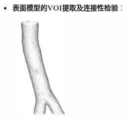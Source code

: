 \begin{frame}
\begin{itemize}
  \item \textbf{表面模型的VOI提取及连接性检验}：
\end{itemize}
\begin{figure}[t]
\centering
\includegraphics[height=2.0in]{../../Figures/postprocessing/mesh/original.eps}
\qquad
{}
\end{figure}
\end{frame}

